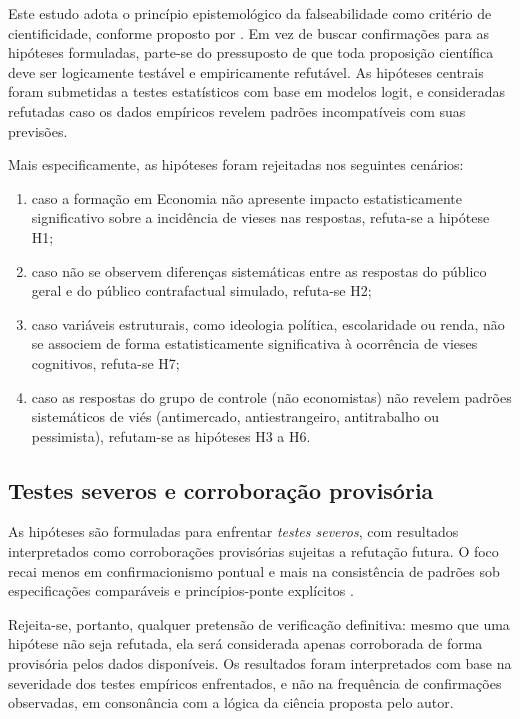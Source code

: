 Este estudo adota o princípio epistemológico da falseabilidade como critério de cientificidade, conforme proposto por . Em vez de buscar confirmações para as hipóteses formuladas, parte-se do pressuposto de que toda proposição científica deve ser logicamente testável e empiricamente refutável. As hipóteses centrais foram submetidas a testes estatísticos com base em modelos logit, e consideradas refutadas caso os dados empíricos revelem padrões incompatíveis com suas previsões.

Mais especificamente, as hipóteses foram rejeitadas nos seguintes cenários:

\begin{enumerate}[label=\alph*)]

    \item caso a formação em Economia não apresente impacto estatisticamente significativo sobre a incidência de vieses nas respostas, refuta-se a hipótese H1;
    \item caso não se observem diferenças sistemáticas entre as respostas do público geral e do público contrafactual simulado, refuta-se H2;
    \item caso variáveis estruturais, como ideologia política, escolaridade ou renda, não se associem de forma estatisticamente significativa à ocorrência de vieses cognitivos, refuta-se H7;
    \item caso as respostas do grupo de controle (não economistas) não revelem padrões sistemáticos de viés (antimercado, antiestrangeiro, antitrabalho ou pessimista), refutam-se as hipóteses H3 a H6.
    
\end{enumerate}

\subsection{Testes severos e corroboração provisória}
As hipóteses são formuladas para enfrentar \textit{testes severos}, com resultados interpretados como corroborações provisórias sujeitas a refutação futura. O foco recai menos em confirmacionismo pontual e mais na consistência de padrões sob especificações comparáveis e princípios-ponte explícitos \cite{hausman2008,stigum2003}.

Rejeita-se, portanto, qualquer pretensão de verificação definitiva: mesmo que uma hipótese não seja refutada, ela será considerada apenas corroborada de forma provisória pelos dados disponíveis. Os resultados foram interpretados com base na severidade dos testes empíricos enfrentados, e não na frequência de confirmações observadas, em consonância com a lógica da ciência proposta pelo autor.

